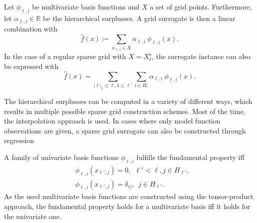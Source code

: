 \documentclass[
  a4paper,  %
  twoside,  %
  bibliography=totoc,
  headsepline,
  cleardoublepage=empty,
  parskip=half,
  draft=false
]{scrbook}
\begin{document}
\begin{definition}
Let $\phi_{\underline{\ell},\underline{i}}$ be multivariate basis functions and $X$ a set of grid points.
Furthermore, let $\alpha_{\underline{\ell},\underline{i}} \in \mathds{R}$ be the hierarchical surplusses.
A grid surrogate is then a linear combination with
\begin{equation}
\hat{f}(x) \coloneqq \sum_{x_{\underline{\ell},\underline{i}} \in X} \alpha_{\underline{\ell},\underline{i}} ~ \phi_{
\underline{\ell},\underline{i}}(x).
\end{equation}
In the case of a regular sparse grid with $X=X^{\mathrm{s}}_{\ell}$, the surrogate instance can also be expressed with
\begin{equation}
\hat{f}(x) = \sum_{|\underline{\ell}|_1 \leq \ell, \underline{1} \leq \ell'} \sum_{\underline{i} \in {H_{\underline{\ell}}}} \alpha_{\underline{\ell},\underline{i}} ~ \phi_{
\underline{\ell},\underline{i}}(x).
\end{equation}
\end{definition}
%
The hierarchical surplusses can be computed in a variety of different ways, which results in multiple possible sparse grid construction schemes.
Most of the time, the interpolation approach is used.
In cases where only model function observations are given, a sparse grid surrogate can also be constructed through regression

\begin{definition}
A family of univariate basis functions $\phi_{\ell,i}$ fulfills the fundamental property iff
\begin{equation}
\begin{split}
&\phi_{\ell,i}(x_{\ell', j}) = 0, ~~  \ell' < \ell, j \in H_{\ell'},\\
&\phi_{\ell,i}(x_{\ell', j}) = \delta_{ij}, ~~  j \in H_{\ell'}.
\end{split}
\end{equation}
As the used multivariate basis functions are constructed using the tensor-product approach, the fundamental property holds for a multivariate basis iff it holds for the univariate one.
\label{def:fund}
\end{definition}
\end{document}
